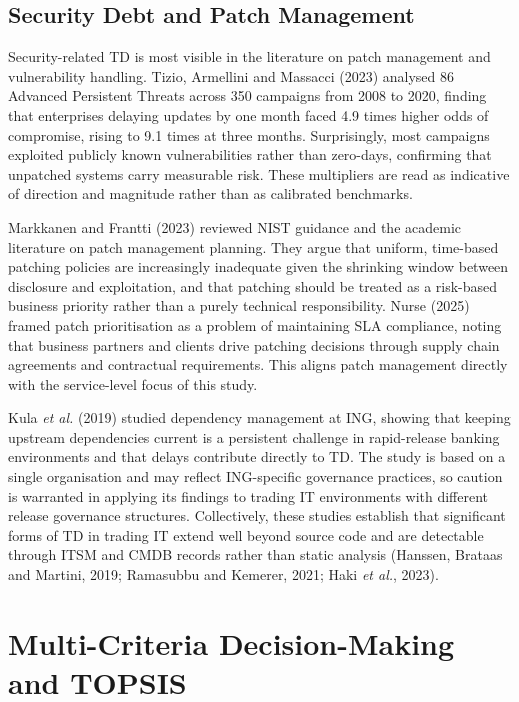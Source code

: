 \documentclass[
  12pt,
  letterpaper,
  12pt,
  oneside,
  english,
  onehalfspacing,
  headsepline]{MastersDoctoralThesis}
\begin{document}
\subsection{Security Debt and Patch
Management}\label{security-debt-and-patch-management}

Security-related TD is most visible in the literature on patch
management and vulnerability handling. Tizio, Armellini and Massacci
(2023) analysed 86 Advanced Persistent Threats across 350 campaigns from
2008 to 2020, finding that enterprises delaying updates by one month
faced 4.9 times higher odds of compromise, rising to 9.1 times at three
months. Surprisingly, most campaigns exploited publicly known
vulnerabilities rather than zero-days, confirming that unpatched systems
carry measurable risk. These multipliers are read as indicative of
direction and magnitude rather than as calibrated benchmarks.

Markkanen and Frantti (2023) reviewed NIST guidance and the academic
literature on patch management planning. They argue that uniform,
time-based patching policies are increasingly inadequate given the
shrinking window between disclosure and exploitation, and that patching
should be treated as a risk-based business priority rather than a purely
technical responsibility. Nurse (2025) framed patch prioritisation as a
problem of maintaining SLA compliance, noting that business partners and
clients drive patching decisions through supply chain agreements and
contractual requirements. This aligns patch management directly with the
service-level focus of this study.

Kula \emph{et al.} (2019) studied dependency management at ING, showing
that keeping upstream dependencies current is a persistent challenge in
rapid-release banking environments and that delays contribute directly
to TD. The study is based on a single organisation and may reflect
ING-specific governance practices, so caution is warranted in applying
its findings to trading IT environments with different release
governance structures. Collectively, these studies establish that
significant forms of TD in trading IT extend well beyond source code and
are detectable through ITSM and CMDB records rather than static analysis
(Hanssen, Brataas and Martini, 2019; Ramasubbu and Kemerer, 2021; Haki
\emph{et al.}, 2023).

\section{Multi-Criteria Decision-Making and
TOPSIS}\label{multi-criteria-decision-making-and-topsis}
\end{document}
